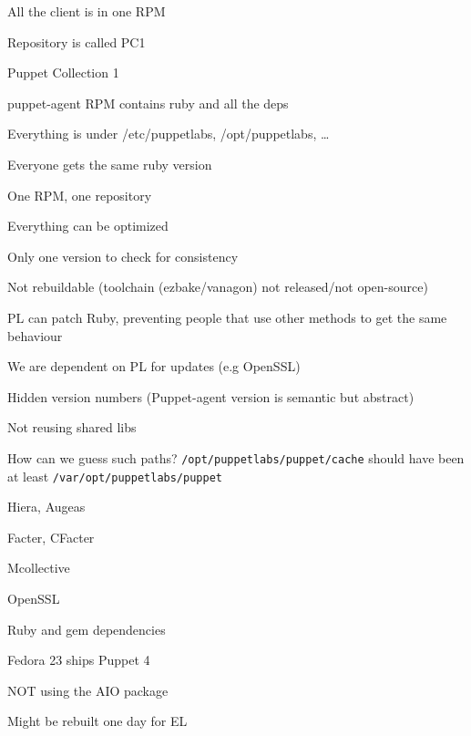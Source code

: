 
\begin{iframe}
\item All the client is in one RPM
\item Repository is called PC1
\item Puppet Collection 1
\item puppet-agent RPM contains ruby and all the deps
\item Everything is under /etc/puppetlabs, /opt/puppetlabs, \dots
\end{iframe}
\begin{iframe}
\item Everyone gets the same ruby version
\item One RPM, one repository
\item Everything can be optimized
\item Only one version to check for consistency
\end{iframe}
\begin{iframe}
\item Not rebuildable (toolchain (ezbake/vanagon) not released/not open-source)
\item PL can patch Ruby, preventing people that use other methods to get the same behaviour
\item We are dependent on PL for updates (e.g OpenSSL)
\item Hidden version numbers (Puppet-agent version is semantic but abstract)
\item Not reusing shared libs
\end{iframe}
\begin{iframe}
\item How can we guess such paths? \texttt{/opt/puppetlabs/puppet/cache} should have been at least \texttt{/var/opt/puppetlabs/puppet}
\end{iframe}
\begin{iframe}
\item Hiera, Augeas
\item Facter, CFacter
\item Mcollective
\item OpenSSL
\item Ruby and gem dependencies
\end{iframe}
\begin{iframe}
\item Fedora 23 ships Puppet 4
\item NOT using the AIO package
\item Might be rebuilt one day for EL
\end{iframe}

